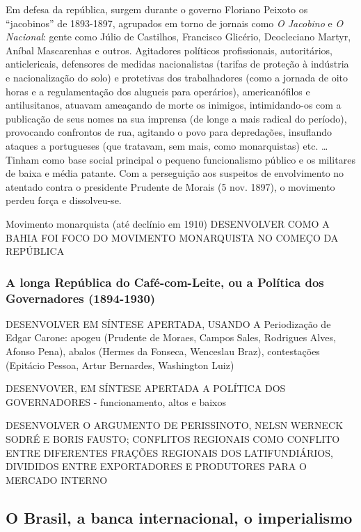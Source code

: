 Em defesa da república, surgem durante o governo Floriano Peixoto os ``jacobinos'' de 1893-1897, agrupados em torno de jornais como \textit{O Jacobino} e \textit{O Nacional}: gente como Júlio de Castilhos, Francisco Glicério, Deocleciano Martyr, Aníbal Mascarenhas e outros. Agitadores políticos profissionais, autoritários, anticlericais, defensores de medidas nacionalistas (tarifas de proteção à indústria e nacionalização do solo) e protetivas dos trabalhadores (como a jornada de oito horas e a regulamentação dos alugueis para operários), americanófilos e antilusitanos, atuavam ameaçando de morte os inimigos, intimidando-os com a publicação de seus nomes na sua imprensa (de longe a mais radical do período), provocando confrontos de rua, agitando o povo para depredações, insuflando ataques a portugueses (que tratavam, sem mais, como monarquistas) etc. \cite{queiroz_radicais_1986}\dots Tinham como base social principal o pequeno funcionalismo público e os militares de baixa e média patante. Com a perseguição aos suspeitos de envolvimento no atentado contra o presidente Prudente de Morais (5 nov. 1897), o movimento perdeu força e dissolveu-se.

Movimento monarquista (até declínio em 1910) \cite{CARONE1970inst,janotti_subversivos_1986} DESENVOLVER COMO A BAHIA FOI FOCO DO MOVIMENTO MONARQUISTA NO COMEÇO DA REPÚBLICA

\subsubsection{A longa República do Café-com-Leite, ou a Política dos Governadores (1894-1930)}\label{subsubsec:cafeleite}

DESENVOLVER EM SÍNTESE APERTADA, USANDO A Periodização de Edgar Carone: apogeu (Prudente de Moraes, Campos Sales, Rodrigues Alves, Afonso Pena), abalos (Hermes da Fonseca, Wenceslau Braz), contestações (Epitácio Pessoa, Artur Bernardes, Washington Luiz) \cite{carone_evolucao_1977}

DESENVOVER, EM SÍNTESE APERTADA A POLÍTICA DOS GOVERNADORES - funcionamento, altos e baixos 

DESENVOLVER O ARGUMENTO DE PERISSINOTO, NELSN WERNECK SODRÉ E BORIS FAUSTO; CONFLITOS REGIONAIS COMO CONFLITO ENTRE DIFERENTES FRAÇÕES REGIONAIS DOS LATIFUNDIÁRIOS, DIVIDIDOS ENTRE EXPORTADORES E PRODUTORES PARA O MERCADO INTERNO

\subsection{O Brasil, a banca internacional, o imperialismo}\label{subsec:brasimper}

